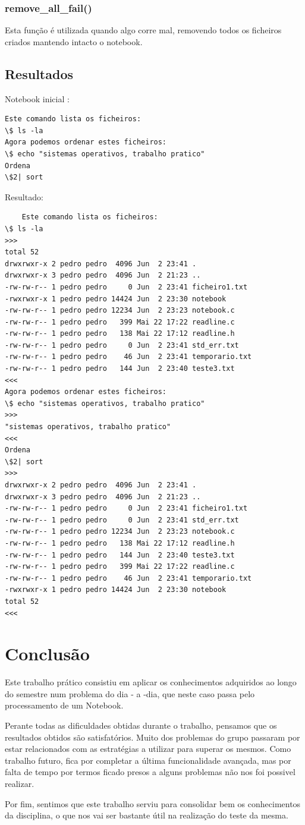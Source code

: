 \documentclass{report}
\begin{document}
\subsection{remove\_all\_fail()}
Esta função é utilizada quando algo corre mal, removendo todos os ficheiros criados mantendo intacto o notebook.

\section{Resultados}
Notebook inicial :
\begin{verbatim}
Este comando lista os ficheiros:
\$ ls -la
Agora podemos ordenar estes ficheiros:
\$ echo "sistemas operativos, trabalho pratico"
Ordena
\$2| sort
\end{verbatim}

Resultado:
\begin{verbatim}
    Este comando lista os ficheiros:
\$ ls -la
>>>
total 52
drwxrwxr-x 2 pedro pedro  4096 Jun  2 23:41 .
drwxrwxr-x 3 pedro pedro  4096 Jun  2 21:23 ..
-rw-rw-r-- 1 pedro pedro     0 Jun  2 23:41 ficheiro1.txt
-rwxrwxr-x 1 pedro pedro 14424 Jun  2 23:30 notebook
-rw-rw-r-- 1 pedro pedro 12234 Jun  2 23:23 notebook.c
-rw-rw-r-- 1 pedro pedro   399 Mai 22 17:22 readline.c
-rw-rw-r-- 1 pedro pedro   138 Mai 22 17:12 readline.h
-rw-rw-r-- 1 pedro pedro     0 Jun  2 23:41 std_err.txt
-rw-rw-r-- 1 pedro pedro    46 Jun  2 23:41 temporario.txt
-rw-rw-r-- 1 pedro pedro   144 Jun  2 23:40 teste3.txt
<<<
Agora podemos ordenar estes ficheiros:
\$ echo "sistemas operativos, trabalho pratico"
>>>
"sistemas operativos, trabalho pratico"
<<<
Ordena
\$2| sort
>>>
drwxrwxr-x 2 pedro pedro  4096 Jun  2 23:41 .
drwxrwxr-x 3 pedro pedro  4096 Jun  2 21:23 ..
-rw-rw-r-- 1 pedro pedro     0 Jun  2 23:41 ficheiro1.txt
-rw-rw-r-- 1 pedro pedro     0 Jun  2 23:41 std_err.txt
-rw-rw-r-- 1 pedro pedro 12234 Jun  2 23:23 notebook.c
-rw-rw-r-- 1 pedro pedro   138 Mai 22 17:12 readline.h
-rw-rw-r-- 1 pedro pedro   144 Jun  2 23:40 teste3.txt
-rw-rw-r-- 1 pedro pedro   399 Mai 22 17:22 readline.c
-rw-rw-r-- 1 pedro pedro    46 Jun  2 23:41 temporario.txt
-rwxrwxr-x 1 pedro pedro 14424 Jun  2 23:30 notebook
total 52
<<<
\end{verbatim}

\chapter{Conclusão}
Este trabalho prático consistiu em aplicar os conhecimentos adquiridos ao longo do semestre num problema do dia - a -dia, que neste caso passa pelo processamento de um Notebook.

Perante todas as dificuldades obtidas durante o trabalho, pensamos que os resultados obtidos são satisfatórios. Muito dos problemas do grupo passaram por estar relacionados com as estratégias a utilizar para superar os mesmos. Como trabalho futuro, fica por completar a última funcionalidade avançada, mas por falta de tempo por termos ficado presos a alguns problemas não nos foi possivel realizar.

Por fim, sentimos que este trabalho serviu para consolidar bem os conhecimentos da disciplina, o que nos vai ser bastante útil na realização do teste da mesma.
\end{document}
